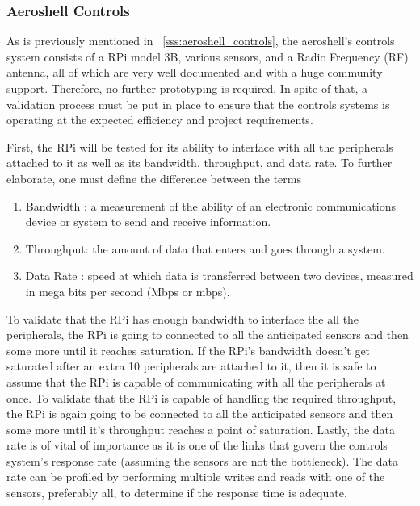 \subsubsection{\label{sss:aeroshell_controls_validation}Aeroshell Controls}

\indent\indent As is previously mentioned in ~\ref{sss:aeroshell_controls}, the aeroshell's controls system consists of a RPi model 3B, various sensors, and a Radio Frequency (RF) antenna, all of which are very well documented and with a huge community support. Therefore, no further prototyping is required. In spite of that, a validation process must be put in place to ensure that the controls systems is operating at the expected efficiency and project requirements.

First, the RPi will be tested for its ability to interface with all the peripherals attached to it as well as its bandwidth, throughput, and data rate. To further elaborate, one must define the difference between the terms %

\begin{enumerate}
    \item Bandwidth : a measurement of the ability of an electronic communications device or system to send and receive information.
    \item Throughput: the amount of data that enters and goes through a system.
    \item Data Rate : speed at which data is transferred between two devices, measured in mega bits per second (Mbps or mbps).
\end{enumerate}

To validate that the RPi has enough bandwidth to interface the all the peripherals, the RPi is going to connected to all the anticipated sensors and then some more until it reaches saturation. If the RPi's bandwidth doesn't get saturated after an extra 10 peripherals are attached to it, then it is safe to assume that the RPi is capable of communicating with all the peripherals at once.
To validate that the RPi is capable of handling the required throughput, the RPi is again going to be connected to all the anticipated sensors and then some more until it's throughput reaches a point of saturation.
Lastly, the data rate is of vital of importance as it is one of the links that govern the controls system's response rate (assuming the sensors are not the bottleneck). The data rate can be profiled by performing multiple writes and reads with one of the sensors, preferably all, to determine if the response time is adequate.

